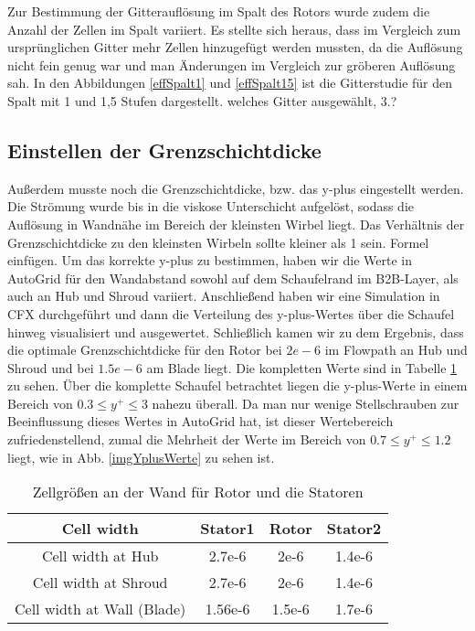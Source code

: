 Zur Bestimmung der Gitterauflösung im Spalt des Rotors wurde zudem die Anzahl der Zellen im Spalt variiert. Es stellte sich heraus, dass im Vergleich zum ursprünglichen Gitter mehr Zellen hinzugefügt werden mussten, da die Auflösung nicht fein genug war und man Änderungen im Vergleich zur gröberen Auflösung sah.  In den Abbildungen \ref{effSpalt1} und \ref{effSpalt15} ist die Gitterstudie für den Spalt mit 1 und 1,5 Stufen dargestellt. \todo welches Gitter ausgewählt, 3.?


%

\subsection{Einstellen der Grenzschichtdicke}
Außerdem musste noch die Grenzschichtdicke, bzw. das y-plus eingestellt werden. Die Strömung wurde bis in die viskose Unterschicht aufgelöst, sodass die Auflösung in Wandnähe im Bereich der kleinsten Wirbel liegt. Das Verhältnis der Grenzschichtdicke zu den kleinsten Wirbeln sollte kleiner als 1 sein. \todo Formel einfügen. Um das korrekte y-plus zu bestimmen, haben wir die Werte in AutoGrid für den Wandabstand sowohl auf dem Schaufelrand im B2B-Layer, als auch an Hub und Shroud variiert.  Anschließend haben wir eine Simulation in CFX durchgeführt und dann die Verteilung des y-plus-Wertes über die Schaufel hinweg visualisiert und ausgewertet. Schließlich kamen wir zu dem Ergebnis, dass die optimale Grenzschichtdicke für den Rotor bei $2e-6$ im Flowpath an Hub und Shroud und bei $1.5e-6$ am Blade liegt. Die kompletten Werte sind in Tabelle \ref{cellWidths} zu sehen. Über die komplette Schaufel betrachtet liegen die y-plus-Werte in einem Bereich von $0.3 \leq y^+ \leq 3$ nahezu überall. Da man nur wenige Stellschrauben zur Beeinflussung dieses Wertes in AutoGrid hat, ist dieser Wertebereich zufriedenstellend, zumal die Mehrheit der Werte im Bereich von $0.7 \leq y^+ \leq 1.2$  liegt, wie in Abb. \ref{imgYplusWerte} zu sehen ist. 

\begin{table}[t]
\centering
\begin{tabular}[t]{cccc}
\toprule
 Cell width  & Stator1 & Rotor & Stator2  \\
\midrule
Cell width at Hub & 2.7e-6 & 2e-6 & 1.4e-6\\
Cell width at Shroud & 2.7e-6 & 2e-6 & 1.4e-6 \\
Cell width at Wall (Blade) & 1.56e-6 & 1.5e-6 & 1.7e-6 \\
\bottomrule
\end{tabular}
\caption{Zellgrößen an der Wand für Rotor und die Statoren}
\label{cellWidths}
\end{table}

